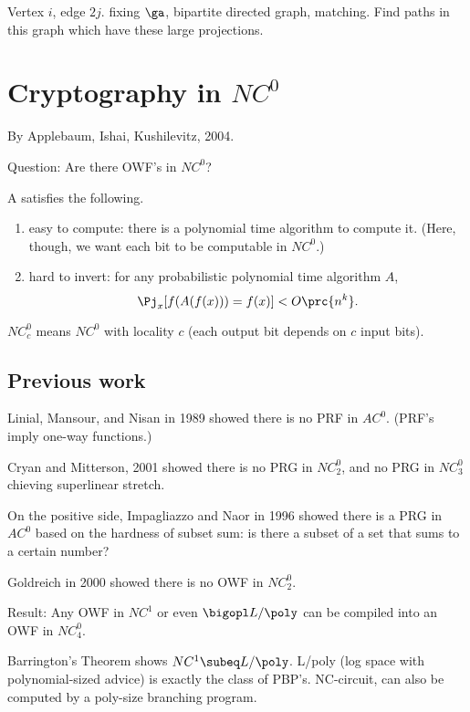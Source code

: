 
Vertex $i$, edge $2j$. 
fixing $\ga$, bipartite directed graph, matching. 
Find paths in this graph which have these large projections. 

\section{Cryptography in $NC^0$}
By Applebaum, Ishai, Kushilevitz, 2004.

Question: Are there OWF's in $NC^0$?

\begin{df}
A  satisfies the following.
\begin{enumerate}
\item
easy to compute: there is a polynomial time algorithm to compute it. (Here, though, we want each bit to be computable in $NC^0$.)
\item
hard to invert: for any probabilistic polynomial time algorithm $A$, 
\[
\Pj_x[f(A(f(x)))=f(x)]<O\prc{n^k}.
\]
\end{enumerate}
\end{df}
$NC_c^0$ means $NC^0$ with locality $c$ (each output bit depends on $c$ input bits).

\subsection{Previous work}
Linial, Mansour, and Nisan in 1989 showed there is no PRF in $AC^0$. (PRF's imply one-way functions.)

Cryan and Mitterson, 2001 showed there is no PRG in $NC_2^0$, and no PRG in $NC_3^0$ chieving superlinear stretch.

On the positive side, Impagliazzo and Naor in 1996 showed there is a PRG in $AC^0$ based on the hardness of subset sum: is there a subset of a set that sums to a certain number? %

Goldreich in 2000 showed there is no OWF in $NC_2^0$.


Result: Any OWF in $NC^1$ or even $\bigopl L/\poly$ can be compiled into an OWF in $NC_4^0$.

Barrington's Theorem shows $NC^1\subeq L/\poly$. L/poly (log space with polynomial-sized advice) is exactly the class of PBP's. NC-circuit, can also be computed by a poly-size branching program.


